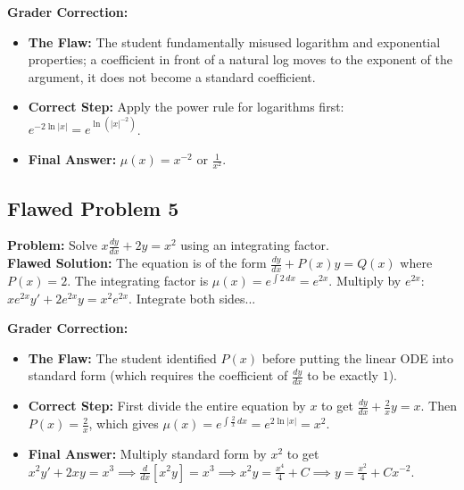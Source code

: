 \documentclass[11pt]{article}
\begin{document}
\textbf{Grader Correction:}
\begin{itemize}
    \item \textbf{The Flaw:} The student fundamentally misused logarithm and exponential properties; a coefficient in front of a natural log moves to the exponent of the argument, it does not become a standard coefficient.
    \item \textbf{Correct Step:} Apply the power rule for logarithms first: $e^{-2\ln|x|} = e^{\ln(|x|^{-2})}$. 
    \item \textbf{Final Answer:} $\mu(x) = x^{-2}$ or $\frac{1}{x^2}$.
\end{itemize}

\subsection*{Flawed Problem 5}
\textbf{Problem:} Solve $x\frac{dy}{dx} + 2y = x^2$ using an integrating factor.
\\
\textbf{Flawed Solution:} The equation is of the form $\frac{dy}{dx} + P(x)y = Q(x)$ where $P(x) = 2$. The integrating factor is $\mu(x) = e^{\int 2 \, dx} = e^{2x}$. Multiply by $e^{2x}$: $xe^{2x}y' + 2e^{2x}y = x^2e^{2x}$. Integrate both sides...

\textbf{Grader Correction:}
\begin{itemize}
    \item \textbf{The Flaw:} The student identified $P(x)$ before putting the linear ODE into standard form (which requires the coefficient of $\frac{dy}{dx}$ to be exactly $1$).
    \item \textbf{Correct Step:} First divide the entire equation by $x$ to get $\frac{dy}{dx} + \frac{2}{x}y = x$. Then $P(x) = \frac{2}{x}$, which gives $\mu(x) = e^{\int \frac{2}{x} \, dx} = e^{2\ln|x|} = x^2$.
    \item \textbf{Final Answer:} Multiply standard form by $x^2$ to get $x^2y' + 2xy = x^3 \implies \frac{d}{dx}[x^2y] = x^3 \implies x^2y = \frac{x^4}{4} + C \implies y = \frac{x^2}{4} + Cx^{-2}$.
\end{itemize}
\end{document}
